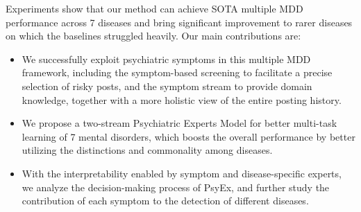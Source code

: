 Experiments show that our method can achieve SOTA multiple MDD performance across 7 diseases and bring significant improvement to rarer diseases on which 
the baselines struggled heavily. 
Our main contributions are:
\begin{itemize}
    \item We successfully exploit psychiatric symptoms in 
this multiple MDD framework, including the symptom-based screening to facilitate a precise selection of risky posts, and the symptom stream to provide domain knowledge, together with a more holistic view of the entire posting history.  
    \item We propose a two-stream Psychiatric Experts Model for better multi-task learning of 7 mental disorders, which boosts the overall performance by better utilizing the distinctions and commonality among diseases. 
    \item With the interpretability enabled by symptom and disease-specific experts, we analyze the decision-making process of PsyEx, and further study the contribution of each symptom to the detection of different diseases. 
\end{itemize}









